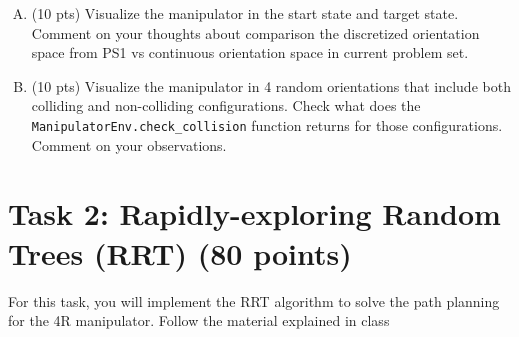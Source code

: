 \documentclass[11pt, oneside, letterpaper]{article}
\begin{document}
\begin{enumerate}[A.]

\item (10 pts)
Visualize the manipulator in the start state and target state. Comment on your thoughts about comparison the discretized orientation space from PS1 vs continuous orientation space in current problem set.

\item (10 pts)
Visualize the manipulator in 4 random orientations that include both colliding and non-colliding configurations. Check what does the \texttt{ManipulatorEnv.check\_collision} function returns for those configurations. Comment on your observations.


\end{enumerate}

\section*{Task 2: Rapidly-exploring Random Trees (RRT) (80 points)}
For this task, you will implement the RRT algorithm to solve the path planning for the 4R manipulator. Follow the material explained in class 
\end{document}
